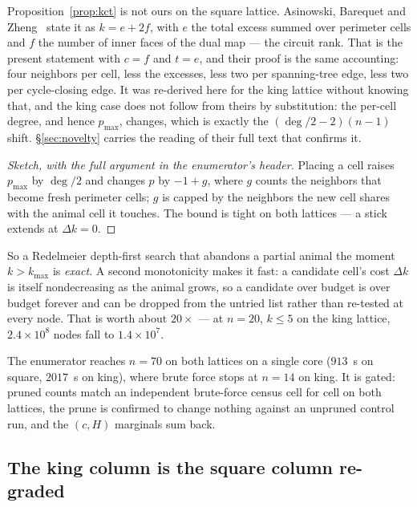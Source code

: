 \documentclass[11pt]{article}
\newcommand{\pmaxx}{p_{\max}}
\begin{document}
\begin{remark}
\label{rem:abzidentity}
Proposition~\ref{prop:kct} is not ours on the square lattice. Asinowski,
Barequet and Zheng~\cite{abz2018} state it as $k = e + 2f$, with $e$ the total
excess summed over perimeter cells and $f$ the number of inner faces of the dual
map --- the circuit rank. That is the present statement with $c = f$ and
$t = e$, and their proof is the same accounting: four neighbors per cell, less
the excesses, less two per spanning-tree edge, less two per cycle-closing edge.
It was re-derived here for the king lattice without knowing that, and the
king case does not follow from theirs by substitution: the per-cell degree, and
hence $\pmaxx$, changes, which is exactly the $(\deg/2 - 2)(n-1)$ shift.
\S\ref{sec:novelty} carries the reading of their full text that confirms it.
\end{remark}

\begin{proof}[Sketch, with the full argument in the enumerator's header]
Placing a cell raises $\pmaxx$ by $\deg/2$ and changes $p$ by $-1 + g$, where $g$
counts the neighbors that become fresh perimeter cells; $g$ is capped by the
neighbors the new cell shares with the animal cell it touches. The bound is
tight on both lattices --- a stick extends at $\Delta k = 0$.
\end{proof}

So a Redelmeier depth-first search that abandons a partial animal the moment
$k > k_{\max}$ is \emph{exact}. A second monotonicity makes it fast: a candidate
cell's cost $\Delta k$ is itself nondecreasing as the animal grows, so a
candidate over budget is over budget forever and can be dropped from the untried
list rather than re-tested at every node. That is worth about $20\times$ --- at
$n = 20$, $k \le 5$ on the king lattice, $2.4\times10^8$ nodes fall to
$1.4\times10^7$.

The enumerator reaches $n = 70$ on both lattices on a single core ($913$~s on
square, $2017$~s on king), where brute force stops at $n = 14$ on king. It is
gated: pruned counts match an independent brute-force census cell for cell on
both lattices, the prune is confirmed to change nothing against an unpruned
control run, and the $(c,H)$ marginals sum back.

\subsection{The king column is the square column re-graded}
\label{sec:reduction}
\end{document}
